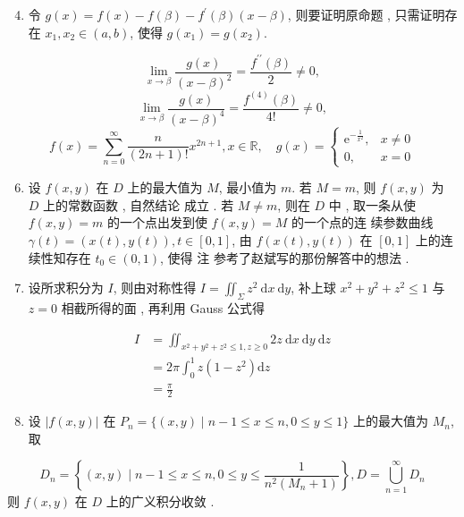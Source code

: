 \documentclass[10pt]{article}
\begin{document}
\begin{enumerate}
  \setcounter{enumi}{3}
  \item  令  $g(x)=f(x)-f(\beta)-f^{\prime}(\beta)(x-\beta)$,  则要证明原命题 ,  只需证明存在  $x_{1}, x_{2} \in(a, b)$,  使得  $g\left(x_{1}\right)=g\left(x_{2}\right)$.
\end{enumerate}
$$
\lim _{x \rightarrow \beta} \frac{g(x)}{(x-\beta)^{2}}=\frac{f^{\prime \prime}(\beta)}{2} \neq 0,
$$
$$
\lim _{x \rightarrow \beta} \frac{g(x)}{(x-\beta)^{4}}=\frac{f^{(4)}(\beta)}{4 !} \neq 0,
$$
$$
f(x)=\sum_{n=0}^{\infty} \frac{n}{(2 n+1) !} x^{2 n+1}, x \in \mathbb{R}, \quad g(x)= \begin{cases}\mathrm{e}^{-\frac{1}{x^{2}}}, & x \neq 0 \\ 0, & x=0\end{cases}
$$

\begin{enumerate}
  \setcounter{enumi}{5}
  \item  设  $f(x, y)$  在  $D$  上的最大值为  $M$,  最小值为  $m$.  若  $M=m$,  则  $f(x, y)$  为  $D$  上的常数函数 ,  自然结论   成立 .  若  $M \neq m$,  则在  $D$  中 ,  取一条从使  $f(x, y)=m$  的一个点出发到使  $f(x, y)=M$  的一个点的连   续参数曲线  $\gamma(t)=(x(t), y(t)), t \in[0,1]$,  由  $f(x(t), y(t))$  在  $[0,1]$  上的连续性知存在  $t_{0} \in(0,1)$,  使得   注   参考了赵斌写的那份解答中的想法 .

  \item  设所求积分为  $I$,  则由对称性得  $I=\iint_{\Sigma} z^{2} \mathrm{~d} x \mathrm{~d} y$,  补上球  $x^{2}+y^{2}+z^{2} \leqslant 1$  与  $z=0$  相截所得的面 ,  再利用  Gauss  公式得 

\end{enumerate}
$$
\begin{aligned}
I &=\iint_{x^{2}+y^{2}+z^{2} \leqslant 1, z \geqslant 0} 2 z \mathrm{~d} x \mathrm{~d} y \mathrm{~d} z \\
&=2 \pi \int_{0}^{1} z\left(1-z^{2}\right) \mathrm{d} z \\
&=\frac{\pi}{2}
\end{aligned}
$$

\begin{enumerate}
  \setcounter{enumi}{7}
  \item  设  $|f(x, y)|$  在  $P_{n}=\{(x, y) \mid n-1 \leqslant x \leqslant n, 0 \leqslant y \leqslant 1\}$  上的最大值为  $M_{n}$,  取 
\end{enumerate}
$$
D_{n}=\left\{(x, y) \mid n-1 \leqslant x \leqslant n, 0 \leqslant y \leqslant \frac{1}{n^{2}\left(M_{n}+1\right)}\right\}, D=\bigcup_{n=1}^{\infty} D_{n}
$$
 则  $f(x, y)$  在  $D$  上的广义积分收敛 .
\end{document}
